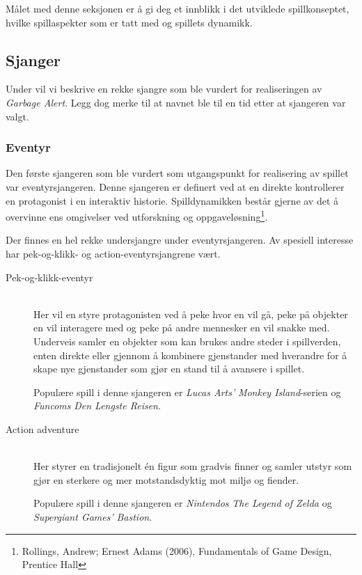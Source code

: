 Målet med denne seksjonen er å gi deg et innblikk i det utviklede
spillkonseptet, hvilke spillaspekter som er tatt med og spillets
dynamikk.


\subsection{Sjanger}



Under vil vi beskrive en rekke sjangre som ble vurdert for realiseringen av \emph{Garbage Alert}. Legg dog merke til at navnet ble til en tid etter at sjangeren var valgt.

\subsubsection{Eventyr}\label{sec:eventyr}
Den første sjangeren som ble vurdert som utgangspunkt for realisering av spillet var eventyrsjangeren. Denne sjangeren er definert ved at en direkte kontrollerer en protagonist i en interaktiv historie. Spilldynamikken består gjerne av det å overvinne ens omgivelser ved utforskning og oppgaveløsning\footnote{Rollings, Andrew; Ernest Adams (2006), Fundamentals of Game Design, Prentice Hall}.

Der finnes en hel rekke undersjangre under eventyrsjangeren. Av spesiell interesse har pek-og-klikk- og action-eventyrsjangrene vært.

\begin{description}

	\item[Pek-og-klikk-eventyr] \hfill \\

	Her vil en styre protagonisten ved å peke hvor en vil gå, peke på objekter en vil interagere med og peke på andre mennesker en vil snakke med. Underveis samler en objekter som kan brukes andre steder i spillverden, enten direkte eller gjennom å kombinere gjenstander med hverandre for å skape nye gjenstander som gjør en  stand til å avansere i spillet.

	Populære spill i denne sjangeren er \emph{Lucas Arts'} \emph{Monkey Island}-serien og \emph{Funcoms} \emph{Den Lengste Reisen}.

	\item[Action adventure] \hfill \\

	Her styrer en tradisjonelt én figur som gradvis finner og samler utstyr som gjør en sterkere og mer motstandsdyktig mot miljø og fiender.


	Populære spill i denne sjangeren er \emph{Nintendos} \emph{The Legend of Zelda} og \emph{Supergiant Games'} \emph{Bastion}.

\end{description}

